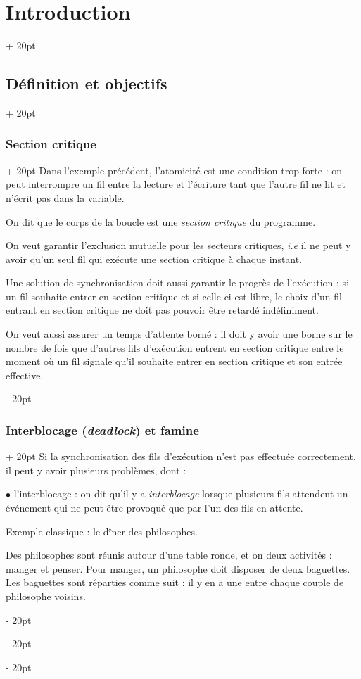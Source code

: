 \documentclass[a4paper, 12pt, twoside]{article}
\newcommand{\ind}[1][20pt]{\advance\leftskip + #1}
\newcommand{\deind}[1][20pt]{\advance\leftskip - #1}
\newenvironment{indt}[2][20pt]{#2 \par \ind[#1]}{\par \deind} %
\begin{document}
\begin{indt}{\section{Introduction}}
\begin{indt}{\subsection{Définition et objectifs}}
            \vspace{12pt}
            
            \begin{indt}{\subsubsection{Section critique}}
                Dans l'exemple précédent, l'atomicité est une condition trop forte : on peut interrompre un fil entre la lecture et l'écriture tant que l'autre fil ne lit et n'écrit pas dans la variable.

                On dit que le corps de la boucle est une \textit{section critique} du programme.

                On veut garantir l'exclusion mutuelle pour les secteurs critiques, \textit{i.e} il ne peut y avoir qu'un seul fil qui exécute une section critique à chaque instant.

                Une solution de synchronisation doit aussi garantir le progrès de l'exécution : si un fil souhaite entrer en section critique et si celle-ci est libre, le choix d'un fil entrant en section critique ne doit pas pouvoir être retardé indéfiniment.

                On veut aussi assurer un temps d'attente borné : il doit y avoir une borne sur le nombre de fois que d'autres fils d'exécution entrent en section critique entre le moment où un fil signale qu'il souhaite entrer en section critique et son entrée effective.
            \end{indt}

            \vspace{12pt}
            
            \begin{indt}{\subsubsection{Interblocage (\textit{deadlock}) et famine}}
                Si la synchronisation des fils d'exécution n'est pas effectuée correctement, il peut y avoir plusieurs problèmes, dont :

                $\bullet$ l'interblocage : on dit qu'il y a \textit{interblocage} lorsque plusieurs fils attendent un événement qui ne peut être provoqué que par l'un des fils en attente.

                Exemple classique : le dîner des philosophes.

                Des philosophes sont réunis autour d'une table ronde, et on deux activités : manger et penser.
                Pour manger, un philosophe doit disposer de deux baguettes.
                Les baguettes sont réparties comme suit : il y en a une entre chaque couple de philosophe voisins.


\end{indt}
\end{indt}
\end{indt}
\end{document}
